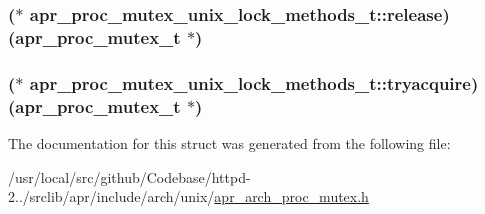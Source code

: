 \subsubsection[{\texorpdfstring{release}{release}}]{($\ast$ apr\+\_\+proc\+\_\+mutex\+\_\+unix\+\_\+lock\+\_\+methods\+\_\+t\+::release) ({\bf apr\+\_\+proc\+\_\+mutex\+\_\+t} $\ast$)}\hypertarget{structapr__proc__mutex__unix__lock__methods__t_aa669af2ceed9e271585d8d3989bdbaa2}{}\label{structapr__proc__mutex__unix__lock__methods__t_aa669af2ceed9e271585d8d3989bdbaa2}
\subsubsection[{\texorpdfstring{tryacquire}{tryacquire}}]{($\ast$ apr\+\_\+proc\+\_\+mutex\+\_\+unix\+\_\+lock\+\_\+methods\+\_\+t\+::tryacquire) ({\bf apr\+\_\+proc\+\_\+mutex\+\_\+t} $\ast$)}\hypertarget{structapr__proc__mutex__unix__lock__methods__t_ad5927c725ef331034e1da7a35dc12402}{}\label{structapr__proc__mutex__unix__lock__methods__t_ad5927c725ef331034e1da7a35dc12402}


The documentation for this struct was generated from the following file\+:\begin{DoxyCompactItemize}
\item 
/usr/local/src/github/\+Codebase/httpd-\/2../srclib/apr/include/arch/unix/\hyperlink{unix_2apr__arch__proc__mutex_8h}{apr\+\_\+arch\+\_\+proc\+\_\+mutex.\+h}\end{DoxyCompactItemize}
